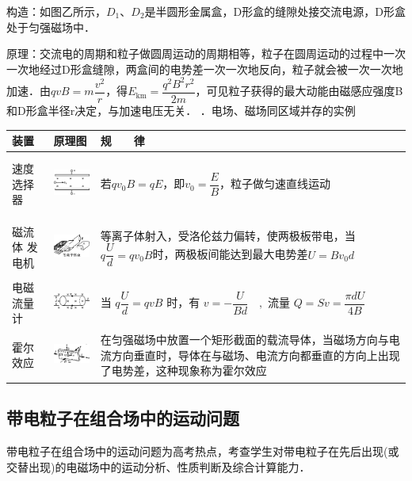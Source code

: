 \documentclass[cn,10.5pt,chinese,mac,chinesefont=founder]{elegantbook}
\begin{document}
构造：如图乙所示，$D_1$、$D_2$是半圆形金属盒，D形盒的缝隙处接交流电源，D形盒处于匀强磁场中．

原理：交流电的周期和粒子做圆周运动的周期相等，粒子在圆周运动的过程中一次一次地经过D形盒缝隙，两盒间的电势差一次一次地反向，粒子就会被一次一次地加速．由$q v B=m \dfrac{v^{2}}{r}$，得$E_{\mathrm{km}}=\dfrac{q^{2} B^{2} r^{2}}{2 m}$，可见粒子获得的最大动能由磁感应强度B和D形盒半径r决定，与加速电压无关．
．电场、磁场同区域并存的实例

\begin{longtable}[]{@{}m{2.2cm}m{3cm}m{6cm}@{}}
\toprule
装置 & 原理图 & 规　　律\tabularnewline
\midrule
\endhead

速度
选择器
&
\includegraphics[width=1.05694in,height=0.75486in]{media/image371.png}
&
若$q v_{0} B=q E$，即$v_{0}=\dfrac{E}{B}$，粒子做匀速直线运动
\tabularnewline

磁流体
发电机
&
\includegraphics[width=1.13194in,height=0.69792in]{media/image372.png}
&
等离子体射入，受洛伦兹力偏转，使两极板带电，当$q \dfrac{U}{d}=q v_{0} B$时，两极板间能达到最大电势差$U=Bv_0d$
\tabularnewline
电磁
流量计
&
\includegraphics[width=1in,height=0.44306in]{media/image373.png}
&
当 $q \dfrac{U}{d}=q v B$ 时，有 $v=-\dfrac{U}{B d} \quad,$ 流量 $Q=S v=\dfrac{\pi d U}{4 B}$
\tabularnewline
霍尔
效应
&
\includegraphics[width=1.09444in,height=0.60347in]{media/image374.png}
&
在匀强磁场中放置一个矩形截面的载流导体，当磁场方向与电流方向垂直时，导体在与磁场、电流方向都垂直的方向上出现了电势差，这种现象称为霍尔效应
\tabularnewline
\bottomrule
\end{longtable}
\newpage
\subsection{带电粒子在组合场中的运动问题}
带电粒子在组合场中的运动问题为高考热点，考查学生对带电粒子在先后出现(或交替出现)的电磁场中的运动分析、性质判断及综合计算能力．
\end{document}
